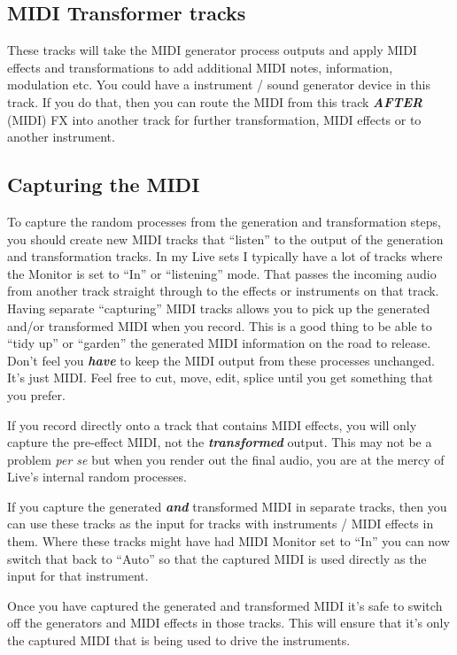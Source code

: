 \documentclass[
  12pt,
  letterpaper,
  oneside,
  open=any]{scrbook}
\begin{document}
\subsection{MIDI Transformer tracks}\label{midi-transformer-tracks}

These tracks will take the MIDI generator process outputs and apply MIDI
effects and transformations to add additional MIDI notes, information,
modulation etc. You could have a instrument / sound generator device in
this track. If you do that, then you can route the MIDI from this track
\textbf{\emph{AFTER}} (MIDI) FX into another track for further
transformation, MIDI effects or to another instrument.

\subsection{Capturing the MIDI}\label{capturing-the-midi}

To capture the random processes from the generation and transformation
steps, you should create new MIDI tracks that ``listen'' to the output
of the generation and transformation tracks. In my Live sets I typically
have a lot of tracks where the Monitor is set to ``In'' or ``listening''
mode. That passes the incoming audio from another track straight through
to the effects or instruments on that track. Having separate
``capturing'' MIDI tracks allows you to pick up the generated and/or
transformed MIDI when you record. This is a good thing to be able to
``tidy up'' or ``garden'' the generated MIDI information on the road to
release. Don't feel you \textbf{\emph{have}} to keep the MIDI output
from these processes unchanged. It's just MIDI. Feel free to cut, move,
edit, splice until you get something that you prefer.

If you record directly onto a track that contains MIDI effects, you will
only capture the pre-effect MIDI, not the \textbf{\emph{transformed}}
output. This may not be a problem \emph{per se} but when you render out
the final audio, you are at the mercy of Live's internal random
processes.

If you capture the generated \textbf{\emph{and}} transformed MIDI in
separate tracks, then you can use these tracks as the input for tracks
with instruments / MIDI effects in them. Where these tracks might have
had MIDI Monitor set to ``In'' you can now switch that back to ``Auto''
so that the captured MIDI is used directly as the input for that
instrument.

Once you have captured the generated and transformed MIDI it's safe to
switch off the generators and MIDI effects in those tracks. This will
ensure that it's only the captured MIDI that is being used to drive the
instruments.
\end{document}
